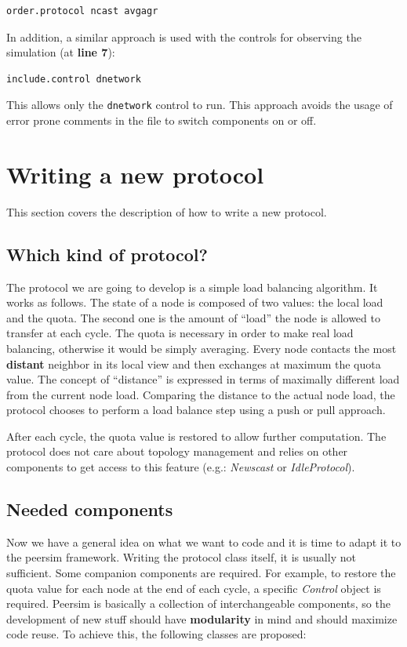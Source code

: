 \documentclass[a4paper,11pt]{article}
\begin{document}
\begin{verbatim}
order.protocol ncast avgagr
\end{verbatim}

In addition, a similar approach is used with the controls for
observing the simulation (at \textbf{line 7}):

\begin{verbatim}
include.control dnetwork
\end{verbatim}

This allows only the \texttt{dnetwork} control to run. This approach
avoids the usage of error prone comments in the file to switch
components on or off.  

\section{Writing a new protocol}

This section covers the description of how to write a new protocol. 


\subsection{Which kind of protocol?}

The protocol we are going to develop is a simple load balancing algorithm.
It works as follows. The state of a node is composed of two values:
the local load and the quota. The second one is the amount of ``load''
the node is allowed to transfer at each cycle. The quota is necessary
in order to make real load balancing, otherwise it would be simply
averaging. Every node contacts the most \textbf{distant} neighbor
in its local view and then exchanges at maximum the quota value. The
concept of ``distance'' is expressed in terms of maximally
different load from the current node load. Comparing the distance
to the actual node load, the protocol chooses to perform a load balance
step using a push or pull approach.

After each cycle, the quota value is restored to allow further computation.
The protocol does not care about topology management and relies on
other components to get access to this feature (e.g.: \emph{Newscast} or
\emph{IdleProtocol}). 


\subsection{Needed components}

Now we have a general idea on what we want to code and it is time to
adapt it to the peersim framework. Writing the protocol class itself,
it is usually not sufficient. Some companion components are required.
For example, to restore the quota value for each node at the end of
each cycle, a specific \emph{Control} object is required. Peersim
is basically a collection of interchangeable components, so the development
of new stuff should have \textbf{modularity} in mind and should maximize
code reuse. To achieve this, the following classes are proposed:
\end{document}
